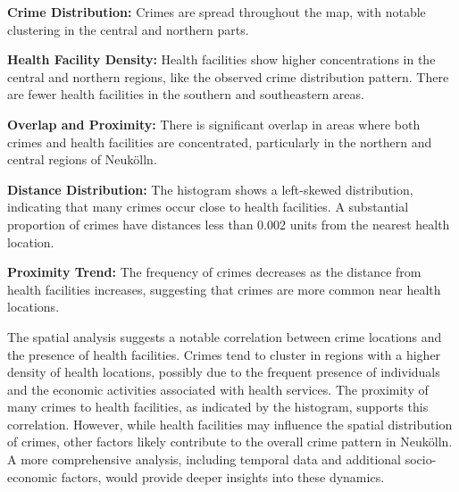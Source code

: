 \textbf{Crime Distribution:} Crimes are spread throughout the map, with notable clustering in the central and northern parts. 

\textbf{Health Facility Density:} Health facilities show higher concentrations in the central and northern regions, like the observed crime distribution pattern. There are fewer health facilities in the southern and southeastern areas. 

\textbf{Overlap and Proximity:} There is significant overlap in areas where both crimes and health facilities are concentrated, particularly in the northern and central regions of Neukölln. 

\textbf{Distance Distribution:} The histogram shows a left-skewed distribution, indicating that many crimes occur close to health facilities. A substantial proportion of crimes have distances less than 0.002 units from the nearest health location. 

\textbf{Proximity Trend:} The frequency of crimes decreases as the distance from health facilities increases, suggesting that crimes are more common near health locations. 

The spatial analysis suggests a notable correlation between crime locations and the presence of health facilities. Crimes tend to cluster in regions with a higher density of health locations, possibly due to the frequent presence of individuals and the economic activities associated with health services. The proximity of many crimes to health facilities, as indicated by the histogram, supports this correlation. However, while health facilities may influence the spatial distribution of crimes, other factors likely contribute to the overall crime pattern in Neukölln. A more comprehensive analysis, including temporal data and additional socio-economic factors, would provide deeper insights into these dynamics. 

